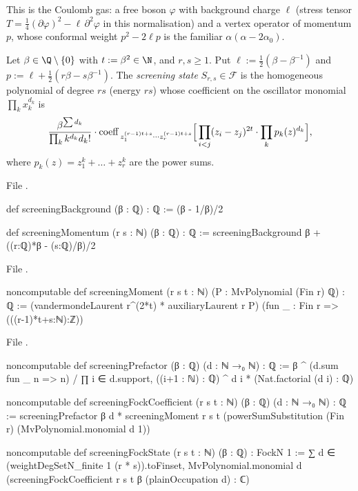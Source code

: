 \begin{physics}
This is the Coulomb gas: a free boson $\varphi$ with background charge $\ell$ (stress tensor
$T = \frac14(\partial\varphi)^2-\ell\,\partial^2\varphi$ in this normalisation) and a vertex operator of
momentum $p$, whose conformal weight $p^2-2\ell p$ is the familiar $\alpha(\alpha-2\alpha_0)$.
\end{physics}

\begin{definition}\label{l06:def:screenstate}
Let $\beta\in\Q\setminus\{0\}$ with $t := \beta^2\in\N$, and $r,s\ge1$. Put
$\ell := \frac12(\beta-\beta^{-1})$ and $p := \ell+\frac12(r\beta-s\beta^{-1})$. The \emph{screening state}
$S_{r,s}\in\mathcal F$ is the homogeneous polynomial of degree $rs$ (energy $rs$) whose coefficient on the
oscillator monomial $\prod_k x_k^{d_k}$ is
\begin{equation*}
 \frac{\beta^{\sum d_k}}{\prod_k k^{d_k}d_k!}\cdot
 \operatorname{coeff}_{\,z_1^{(r-1)t+s}\cdots z_r^{(r-1)t+s}}\Bigl[\,\prod_{i<j}(z_i-z_j)^{2t}\cdot
 \prod_k p_k(z)^{d_k}\Bigr],
\end{equation*}
where $p_k(z) = z_1^k+\dots+z_r^k$ are the power sums.
\end{definition}

File .
\begin{leancode}
def screeningBackground (β : ℚ) : ℚ := (β - 1/β)/2

def screeningMomentum (r s : ℕ) (β : ℚ) : ℚ :=
  screeningBackground β + ((r:ℚ)*β - (s:ℚ)/β)/2
\end{leancode}
File .
\begin{leancode}
noncomputable def screeningMoment (r s t : ℕ) (P : MvPolynomial (Fin r) ℚ) : ℚ :=
  (vandermondeLaurent r^(2*t) * auxiliaryLaurent r P)
    (fun _ : Fin r => (((r-1)*t+s:ℕ):ℤ))
\end{leancode}
File .
\begin{leancode}
noncomputable def screeningPrefactor (β : ℚ) (d : ℕ →₀ ℕ) : ℚ :=
  β ^ (d.sum fun _ n => n) /
    ∏ i ∈ d.support, ((i+1 : ℕ) : ℚ) ^ d i * (Nat.factorial (d i) : ℚ)

noncomputable def screeningFockCoefficient (r s t : ℕ) (β : ℚ) (d : ℕ →₀ ℕ) : ℚ :=
  screeningPrefactor β d * screeningMoment r s t
    (powerSumSubstitution (Fin r) (MvPolynomial.monomial d 1))

noncomputable def screeningFockState (r s t : ℕ) (β : ℚ) : FockN 1 :=
  ∑ d ∈ (weightDegSetN_finite 1 (r * s)).toFinset,
    MvPolynomial.monomial d (screeningFockCoefficient r s t β (plainOccupation d) : ℂ)
\end{leancode}

